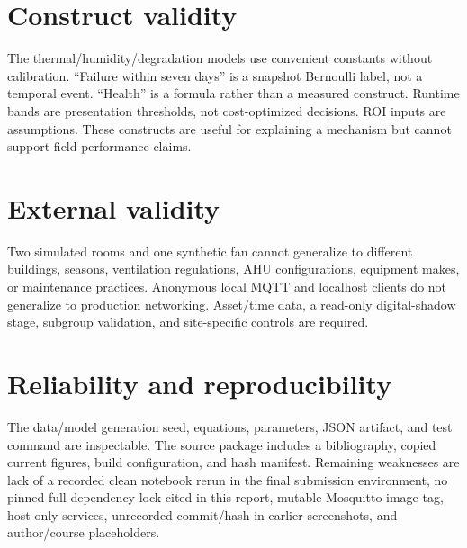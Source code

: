 \section{Construct validity}
The thermal/humidity/degradation models use convenient constants without calibration. ``Failure within seven days'' is a snapshot Bernoulli label, not a temporal event. ``Health'' is a formula rather than a measured construct. Runtime bands are presentation thresholds, not cost-optimized decisions. ROI inputs are assumptions. These constructs are useful for explaining a mechanism but cannot support field-performance claims.

\section{External validity}
Two simulated rooms and one synthetic fan cannot generalize to different buildings, seasons, ventilation regulations, AHU configurations, equipment makes, or maintenance practices. Anonymous local MQTT and localhost clients do not generalize to production networking. Asset/time data, a read-only digital-shadow stage, subgroup validation, and site-specific controls are required.

\section{Reliability and reproducibility}
The data/model generation seed, equations, parameters, JSON artifact, and test command are inspectable. The source package includes a bibliography, copied current figures, build configuration, and hash manifest. Remaining weaknesses are lack of a recorded clean notebook rerun in the final submission environment, no pinned full dependency lock cited in this report, mutable Mosquitto image tag, host-only services, unrecorded commit/hash in earlier screenshots, and author/course placeholders.

